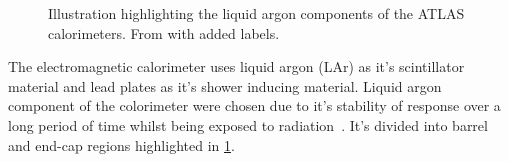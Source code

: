 \begin{figure}
    \centering
    \caption[Illustration highlighting the liquid argon components of the ATLAS calorimeters]{Illustration highlighting the liquid argon components of the ATLAS calorimeters.
        From \cite{ATLASLarImage} with added labels.}
    \label{fig:method:ATLAS:LAr}
\end{figure}

The electromagnetic calorimeter uses liquid argon (LAr) as it's scintillator material and lead plates as it's shower inducing material. Liquid argon component of the colorimeter were chosen due to it's stability of response over a long period of time whilst being exposed to radiation~\cite{ATLAS:LAr-TDR}. It's divided into barrel and end-cap regions highlighted in \cref{fig:method:ATLAS:LAr}. 

